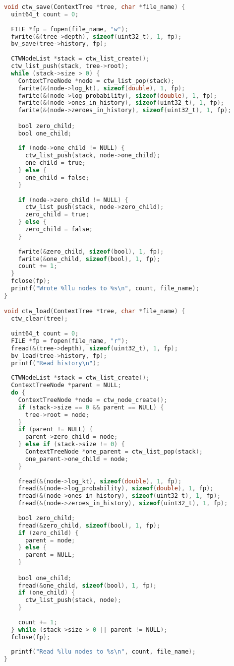 \documentclass[fancychapters]{report}   	%
\begin{document}
\begin{lstlisting}[language=C,caption={context_tree.c}]
void ctw_save(ContextTree *tree, char *file_name) {
  uint64_t count = 0;
  
  FILE *fp = fopen(file_name, "w");
  fwrite(&(tree->depth), sizeof(uint32_t), 1, fp);
  bv_save(tree->history, fp);
  
  CTWNodeList *stack = ctw_list_create();
  ctw_list_push(stack, tree->root);
  while (stack->size > 0) {
    ContextTreeNode *node = ctw_list_pop(stack);
    fwrite(&(node->log_kt), sizeof(double), 1, fp);
    fwrite(&(node->log_probability), sizeof(double), 1, fp);
    fwrite(&(node->ones_in_history), sizeof(uint32_t), 1, fp);
    fwrite(&(node->zeroes_in_history), sizeof(uint32_t), 1, fp);

    bool zero_child;
    bool one_child;
    
    if (node->one_child != NULL) {
      ctw_list_push(stack, node->one_child);
      one_child = true;
    } else {
      one_child = false;
    }
    
    if (node->zero_child != NULL) {
      ctw_list_push(stack, node->zero_child);
      zero_child = true;
    } else {
      zero_child = false;
    }
    
    fwrite(&zero_child, sizeof(bool), 1, fp);
    fwrite(&one_child, sizeof(bool), 1, fp);
    count += 1;
  }
  fclose(fp);
  printf("Wrote %llu nodes to %s\n", count, file_name);
}

void ctw_load(ContextTree *tree, char *file_name) {
  ctw_clear(tree);
  
  uint64_t count = 0;
  FILE *fp = fopen(file_name, "r");
  fread(&(tree->depth), sizeof(uint32_t), 1, fp);
  bv_load(tree->history, fp);
  printf("Read history\n");
  
  CTWNodeList *stack = ctw_list_create();
  ContextTreeNode *parent = NULL;
  do {
    ContextTreeNode *node = ctw_node_create();
    if (stack->size == 0 && parent == NULL) {
      tree->root = node;
    }
    if (parent != NULL) {
      parent->zero_child = node;
    } else if (stack->size != 0) {
      ContextTreeNode *one_parent = ctw_list_pop(stack);
      one_parent->one_child = node;
    }
    
    fread(&(node->log_kt), sizeof(double), 1, fp);
    fread(&(node->log_probability), sizeof(double), 1, fp);
    fread(&(node->ones_in_history), sizeof(uint32_t), 1, fp);
    fread(&(node->zeroes_in_history), sizeof(uint32_t), 1, fp);
    
    bool zero_child;
    fread(&zero_child, sizeof(bool), 1, fp);
    if (zero_child) {
      parent = node;
    } else {
      parent = NULL;
    }

    bool one_child;
    fread(&one_child, sizeof(bool), 1, fp);
    if (one_child) {
      ctw_list_push(stack, node);
    }
    
    count += 1;
  } while (stack->size > 0 || parent != NULL);
  fclose(fp);
  
  printf("Read %llu nodes to %s\n", count, file_name);
}
\end{lstlisting}
\end{document}

